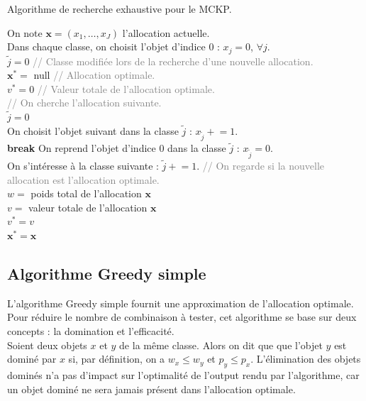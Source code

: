 \documentclass{article}
\newcommand{\pluseq}{\mathrel{+}=}
\newcommand\comm[1]{\footnotesize\ttfamily\textcolor{gray}{// #1}}
\begin{document}
\begin{algorithm}[!ht]
\caption{Algorithme de recherche exhaustive pour le MCKP.}
\label{alg:recherche-exhaustive}
\small
{}
On note $\mathbf{x} = (x_1, \dots, x_J)$ l'allocation actuelle.\\
Dans chaque classe, on choisit l'objet d'indice 0 : $x_j = 0$, $\forall j$.\\
$\tilde{j}=0$ \comm{Classe modifiée lors de la recherche d'une nouvelle allocation.}\\
$\mathbf{x}^{*} = $ null \comm{Allocation optimale.}\\
$v^{*} = 0$ \comm{Valeur totale de l'allocation optimale.}\\
{
	\comm{On cherche l'allocation suivante.}\\
	$\tilde{j} = 0$\\
	{
		{
			On choisit l'objet suivant dans la classe $\tilde{j}$ : $x_{\tilde{j}} \pluseq 1$.\\
			\textbf{break}
		}
		{
			On reprend l'objet d'indice 0 dans la classe $\tilde{j}$ : $x_{\tilde{j}} = 0$.\\
			On s'intéresse à la classe suivante : $\tilde{j} \pluseq 1$.
		}
	}
	\comm{On regarde si la nouvelle allocation est l'allocation optimale.}\\
	$w =$ poids total de l'allocation $\mathbf{x}$\\
	{
		$v =$ valeur totale de l'allocation $\mathbf{x}$\\
		{
			$v^{*} = v$\\
			$\mathbf{x}^{*} = \mathbf{x}$\\
		}
	}
}
\end{algorithm}

\newpage
\subsection{Algorithme Greedy simple}
L'algorithme Greedy simple fournit une approximation de l'allocation optimale. Pour réduire le nombre de combinaison à tester, cet algorithme se base sur deux concepts : la domination et l'efficacité.\\
Soient deux objets $x$ et $y$ de la même classe. Alors on dit que que l'objet $y$ est dominé par $x$ si, par définition, on a $w_{x} \leq w_{y}$ et $p_y \leq p_x$. L'élimination des objets dominés n'a pas d'impact sur l'optimalité de l'output rendu par l'algorithme, car un objet dominé ne sera jamais présent dans l'allocation optimale.
\end{document}
